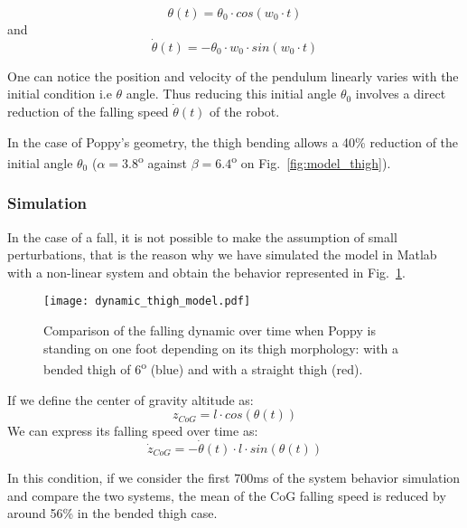 \begin{equation}
    \theta(t) = \theta_0 \cdot cos(w_0\cdot t)
\end{equation}
and
\begin{equation}
    \dot{\theta}(t) = -\theta_0 \cdot w_0 \cdot sin(w_0\cdot t)
\end{equation}

One can notice the position and velocity of the pendulum linearly varies with the initial condition i.e $\theta$ angle. Thus reducing this initial angle $\theta_0$ involves a direct reduction of the falling speed $\dot{\theta}(t)$ of the robot.

In the case of Poppy's geometry, the thigh bending allows a 40\% reduction of the initial angle $\theta_0$ ($\alpha = 3.8$\textsuperscript{o} against $ \beta = 6.4$\textsuperscript{o} on Fig.~\ref{fig:model_thigh}).

\subsubsection{Simulation} %

In the case of a fall, it is not possible to make the assumption of small perturbations, that is the reason why we have simulated the model in Matlab with a non-linear system and obtain the behavior represented in Fig.~\ref{fig:dynamic_thigh_model}.

\begin{figure}[thpb]
    \centering
    \texttt{[image: dynamic\_thigh\_model.pdf]}
    \caption{Comparison of the falling dynamic over time when Poppy is standing on one foot depending on  its thigh morphology: with a bended thigh of 6\textsuperscript{o} (blue) and with a straight thigh (red).}
    \label{fig:dynamic_thigh_model}
\end{figure}

If we define the center of gravity altitude as:
\begin{equation}
    z_{CoG} = l \cdot cos(\theta(t))
\end{equation}
We can express its falling speed over time as:
\begin{equation}
    \dot{z}_{CoG} = - \dot{\theta}(t) \cdot l \cdot sin(\theta(t))
\end{equation}

In this condition, if we consider the first 700ms of the system behavior simulation and compare the two systems, the mean of the CoG falling speed is reduced by around 56\% in the bended thigh case.


